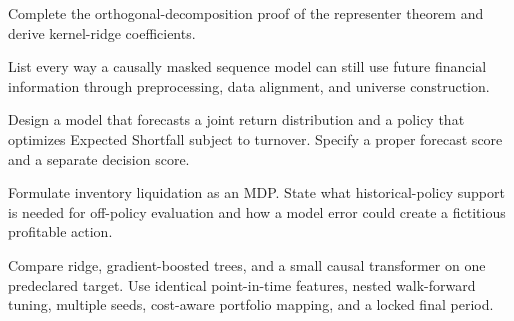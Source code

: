 \begin{exercise}
Complete the orthogonal-decomposition proof of the representer theorem and derive
kernel-ridge coefficients.
\end{exercise}
\begin{exercise}
List every way a causally masked sequence model can still use future financial
information through preprocessing, data alignment, and universe construction.
\end{exercise}
\begin{exercise}
Design a model that forecasts a joint return distribution and a policy that optimizes
Expected Shortfall subject to turnover. Specify a proper forecast score and a
separate decision score.
\end{exercise}
\begin{exercise}
Formulate inventory liquidation as an MDP. State what historical-policy support is
needed for off-policy evaluation and how a model error could create a fictitious
profitable action.
\end{exercise}
\begin{exercise}[Research]
Compare ridge, gradient-boosted trees, and a small causal transformer on one
predeclared target. Use identical point-in-time features, nested walk-forward tuning,
multiple seeds, cost-aware portfolio mapping, and a locked final period.
\end{exercise}
